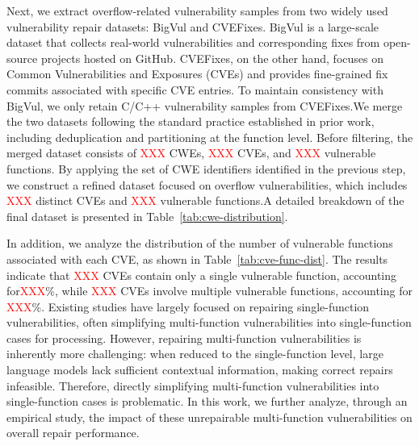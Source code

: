 Next, we extract overflow-related vulnerability samples from two widely used vulnerability repair datasets: BigVul\cite{bigvul} and CVEFixes\cite{bhandari2021:cvefixes}. BigVul is a large-scale dataset that collects real-world vulnerabilities and corresponding fixes from open-source projects hosted on GitHub. CVEFixes, on the other hand, focuses on Common Vulnerabilities and Exposures (CVEs) and provides fine-grained fix commits associated with specific CVE entries. To maintain consistency with BigVul, we only retain C/C++ vulnerability samples from CVEFixes.We merge the two datasets following the standard practice established in prior work\cite{zhou2024large}, including deduplication and partitioning at the function level. Before filtering, the merged dataset consists of \textcolor{red}{XXX} CWEs, \textcolor{red}{XXX} CVEs, and \textcolor{red}{XXX} vulnerable functions. By applying the set of CWE identifiers identified in the previous step, we construct a refined dataset focused on overflow vulnerabilities, which includes \textcolor{red}{XXX} distinct CVEs and \textcolor{red}{XXX} vulnerable functions.A detailed breakdown of the final dataset is presented in Table~\ref{tab:cwe-distribution}.

In addition, we analyze the distribution of the number of vulnerable functions associated with each CVE, as shown in Table~\ref{tab:cve-func-dist}. The results indicate that \textcolor{red}{XXX} CVEs contain only a single vulnerable function, accounting for\textcolor{red}{XXX}\%, while \textcolor{red}{XXX} CVEs involve multiple vulnerable functions, accounting for \textcolor{red}{XXX}\%. Existing studies have largely focused on repairing single-function vulnerabilities, often simplifying multi-function vulnerabilities into single-function cases for processing. However, repairing multi-function vulnerabilities is inherently more challenging: when reduced to the single-function level, large language models lack sufficient contextual information, making correct repairs infeasible. Therefore, directly simplifying multi-function vulnerabilities into single-function cases is problematic. In this work, we further analyze, through an empirical study, the impact of these unrepairable multi-function vulnerabilities on overall repair performance.


